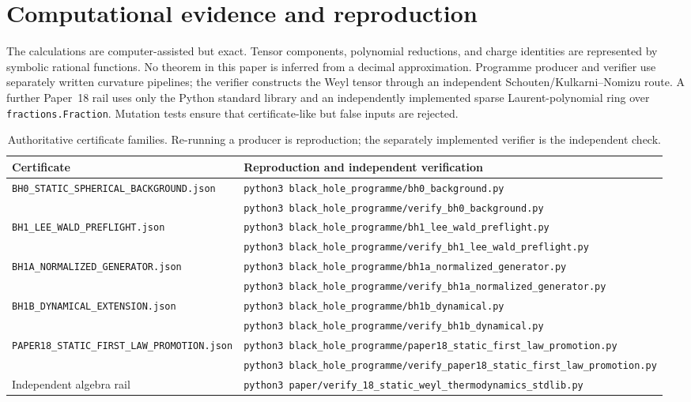 \documentclass[11pt]{article}
\theoremstyle{definition}
\theoremstyle{remark}
\newcommand{\cert}[1]{\nolinkurl{#1}}
\begin{document}
\section{Computational evidence and reproduction}
\label{sec:reproduction}

The calculations are computer-assisted but exact.  Tensor components,
polynomial reductions, and charge identities are represented by symbolic
rational functions.  No theorem in this paper is inferred from a decimal
approximation.  Programme producer and verifier use separately written
curvature pipelines; the verifier constructs the Weyl tensor through an
independent Schouten/Kulkarni--Nomizu route.  A further Paper~18 rail uses
only the Python standard library and an independently implemented sparse
Laurent-polynomial ring over \texttt{fractions.Fraction}.  Mutation tests
ensure that certificate-like but false inputs are rejected.

\begin{table}[ht]
\centering
\small
\begin{tabularx}{\textwidth}{@{}p{}Y@{}}
\toprule
Certificate & Reproduction and independent verification\\
\midrule
\cert{BH0_STATIC_SPHERICAL_BACKGROUND.json}
& \texttt{python3 black\_hole\_programme/bh0\_background.py}\\
& \texttt{python3 black\_hole\_programme/verify\_bh0\_background.py}\\[1mm]
\cert{BH1_LEE_WALD_PREFLIGHT.json}
& \texttt{python3 black\_hole\_programme/bh1\_lee\_wald\_preflight.py}\\
& \texttt{python3 black\_hole\_programme/verify\_bh1\_lee\_wald\_preflight.py}\\[1mm]
\cert{BH1A_NORMALIZED_GENERATOR.json}
& \texttt{python3 black\_hole\_programme/bh1a\_normalized\_generator.py}\\
& \texttt{python3 black\_hole\_programme/verify\_bh1a\_normalized\_generator.py}\\[1mm]
\cert{BH1B_DYNAMICAL_EXTENSION.json}
& \texttt{python3 black\_hole\_programme/bh1b\_dynamical.py}\\
& \texttt{python3 black\_hole\_programme/verify\_bh1b\_dynamical.py}\\[1mm]
\cert{PAPER18_STATIC_FIRST_LAW_PROMOTION.json}
& \texttt{python3 black\_hole\_programme/paper18\_static\_first\_law\_promotion.py}\\
& \texttt{python3 black\_hole\_programme/verify\_paper18\_static\_first\_law\_promotion.py}\\[1mm]
Independent algebra rail
& \texttt{python3 paper/verify\_18\_static\_weyl\_thermodynamics\_stdlib.py}\\
\bottomrule
\end{tabularx}
\caption{Authoritative certificate families.  Re-running a producer is
reproduction; the separately implemented verifier is the independent
check.}
\end{table}
\end{document}
